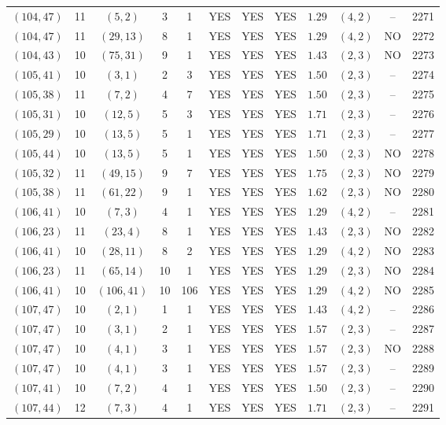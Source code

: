 \begin{longtable}{|c|c|c|c|c|c|c|c|c|c|c|c|}
$(104,47)$ & 11 & $(5,2)$ & 3 & 1 & YES & YES & YES & $1.29$ & $(4,2)$ & -- & 2271\\
$(104,47)$ & 11 & $(29,13)$ & 8 & 1 & YES & YES & YES & $1.29$ & $(4,2)$ & NO & 2272\\
$(104,43)$ & 10 & $(75,31)$ & 9 & 1 & YES & YES & YES & $1.43$ & $(2,3)$ & NO & 2273\\
$(105,41)$ & 10 & $(3,1)$ & 2 & 3 & YES & YES & YES & $1.50$ & $(2,3)$ & -- & 2274\\
$(105,38)$ & 11 & $(7,2)$ & 4 & 7 & YES & YES & YES & $1.50$ & $(2,3)$ & -- & 2275\\
$(105,31)$ & 10 & $(12,5)$ & 5 & 3 & YES & YES & YES & $1.71$ & $(2,3)$ & -- & 2276\\
$(105,29)$ & 10 & $(13,5)$ & 5 & 1 & YES & YES & YES & $1.71$ & $(2,3)$ & -- & 2277\\
$(105,44)$ & 10 & $(13,5)$ & 5 & 1 & YES & YES & YES & $1.50$ & $(2,3)$ & NO & 2278\\
$(105,32)$ & 11 & $(49,15)$ & 9 & 7 & YES & YES & YES & $1.75$ & $(2,3)$ & NO & 2279\\
$(105,38)$ & 11 & $(61,22)$ & 9 & 1 & YES & YES & YES & $1.62$ & $(2,3)$ & NO & 2280\\
$(106,41)$ & 10 & $(7,3)$ & 4 & 1 & YES & YES & YES & $1.29$ & $(4,2)$ & -- & 2281\\
$(106,23)$ & 11 & $(23,4)$ & 8 & 1 & YES & YES & YES & $1.43$ & $(2,3)$ & NO & 2282\\
$(106,41)$ & 10 & $(28,11)$ & 8 & 2 & YES & YES & YES & $1.29$ & $(4,2)$ & NO & 2283\\
$(106,23)$ & 11 & $(65,14)$ & 10 & 1 & YES & YES & YES & $1.29$ & $(2,3)$ & NO & 2284\\
$(106,41)$ & 10 & $(106,41)$ & 10 & 106 & YES & YES & YES & $1.29$ & $(4,2)$ & NO & 2285\\
$(107,47)$ & 10 & $(2,1)$ & 1 & 1 & YES & YES & YES & $1.43$ & $(4,2)$ & -- & 2286\\
$(107,47)$ & 10 & $(3,1)$ & 2 & 1 & YES & YES & YES & $1.57$ & $(2,3)$ & -- & 2287\\
$(107,47)$ & 10 & $(4,1)$ & 3 & 1 & YES & YES & YES & $1.57$ & $(2,3)$ & NO & 2288\\
$(107,47)$ & 10 & $(4,1)$ & 3 & 1 & YES & YES & YES & $1.57$ & $(2,3)$ & -- & 2289\\
$(107,41)$ & 10 & $(7,2)$ & 4 & 1 & YES & YES & YES & $1.50$ & $(2,3)$ & -- & 2290\\
$(107,44)$ & 12 & $(7,3)$ & 4 & 1 & YES & YES & YES & $1.71$ & $(2,3)$ & -- & 2291\\

\end{longtable}
